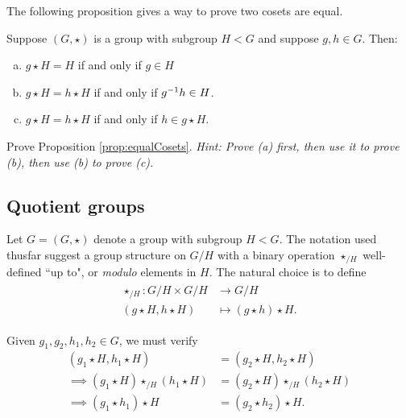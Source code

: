 \documentclass[../algebraNotesMSRI-UP2016.tex]{subfiles}
\begin{document}
\begin{frame}
The following proposition gives a way to prove two cosets are equal.

\smallGap
\begin{prop}\label{prop:equalCosets}
Suppose $(G,\star)$ is a group with subgroup $H< G$ and suppose $g,h\in G$.  Then:
\begin{enumerate}[(a)]
\item $g\star H=H$ if and only if $g\in H$
\item $g\star H=h\star H$ if and only if $g^{-1}h\in H$.
\item $g\star H=h\star H$ if and only if $h\in g\star H$.
\end{enumerate}
\end{prop}

\smallGap
\begin{exe}[cf. Problem 68]\label{exe:prob68}
Prove Proposition \ref{prop:equalCosets}.  \textit{Hint: Prove {(a)} first, then use it to prove {(b)}, then use {(b)} to prove {(c)}.}
\end{exe}
\end{frame}

\subsection[\subsecname]{Quotient groups}
\begin{frame}{\subsecname}
Let $G=(G,\star)$ denote a group with subgroup $H< G$.  The notation used thusfar suggest a group structure on $G/H$ with a binary operation $\star_{/H}$ well-defined ``up to", or \emph{modulo} elements in $H$.  The natural choice is to define
\begin{gather}\label{eq:quotientOperation}
\begin{split}
\star_{/H}: G/H\times G/H &\to G/H \\
(g\star H,h\star H) &\mapsto (g\star h)\star H.
\end{split}
\end{gather} 

\smallGap
Given $g_1,g_2,h_1,h_2\in G$, we must verify 
\begin{align*}
(g_1\star H,h_1\star H) &=(g_2\star H,h_2\star H) \\
\implies (g_1\star H)\star_{/H}(h_1\star H) &=(g_2\star H)\star_{/H}(h_2\star H) \\
\implies (g_1\star h_1)\star H &= (g_2\star h_2)\star H.
\end{align*}
\end{frame}
\end{document}
